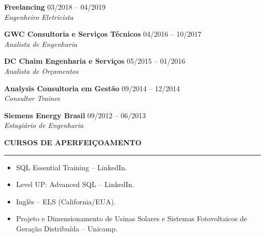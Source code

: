 \documentclass[11pt,a4paper]{article}
\newcommand{\resumosection}[1]{
    \vspace{4mm}
    {\large\textbf{\MakeUppercase{#1}}} %
    \vspace{1mm}
    \hrule %
    \vspace{4mm}    
    \vspace{-2mm}
}
\begin{document}
\vspace{2mm}


\noindent \textbf{Freelancing} \hfill 03/2018 -- 04/2019 \\
\textit{Engenheiro Eletricista}

\noindent \textbf{GWC Consultoria e Serviços Técnicos} \hfill 04/2016 -- 10/2017 \\
\textit{Analista de Engenharia}

\noindent \textbf{DC Chaim Engenharia e Serviços} \hfill 05/2015 -- 01/2016 \\
\textit{Analista de Orçamentos}

\noindent \textbf{Analysis Consultoria em Gestão} \hfill 09/2014 -- 12/2014 \\
\textit{Consultor Trainee}

\noindent \textbf{Siemens Energy Brasil} \hfill 09/2012 -- 06/2013 \\
\textit{Estagiário de Engenharia}

\resumosection{CURSOS DE APERFEIÇOAMENTO}
\begin{itemize}[leftmargin=*, noitemsep]
    \item SQL Essential Training -- LinkedIn. 
    \item Level UP: Advanced SQL -- LinkedIn.
    \item Inglês -- ELS (California/EUA). 
    \item Projeto e Dimensionamento de Usinas Solares e Sistemas Fotovoltaicos de Geração Distribuída -- Unicamp.
\end{itemize}
\end{document}
